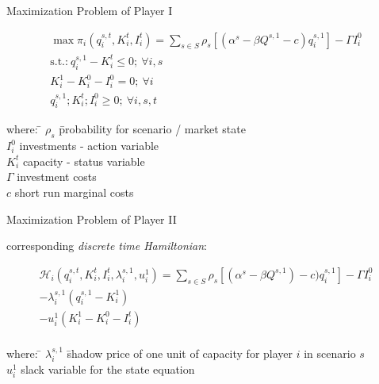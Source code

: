 \begin{frame}{Maximization Problem of Player I}

\begin{gather}
	\max \pi_i(q_{i}^{s,t},K_{i}^t,I_{i}^t)=
	\sum_{s\in S} \rho_s \left[ \left(\alpha^s- \beta Q^{s,1} - c\right) q_{i}^{s,1}  \right] - \Gamma I_{i}^{0} \label{eq:oligopmax2} \\
			\text{s.t.:} \  q_{i}^{s,1} - K_{i}^t \leq 0; \ \forall i,s \label{eq:capacitycon} \\ 
										  K^{1}_{i}  - K^{0}_{i}  - I_{i}^0 = 0 ; \ \forall i  \label{eq:state} \\
										   q_{i}^{s,1}; K^t_{i}; I_{i}^0	\geq 0; \ \forall i,s,t  \nonumber
\end{gather}

{\small
\begin{tabbing}
where: \= $\rho_s$ \= probability for scenario /  market state\\
\> $I_{i}^{0}$     \>   investments - action variable  \\
\> $K_{i}^t $      \>   capacity - status variable \\
\> $\Gamma$        \>   investment costs \\
\> $c$             \>   short run marginal costs \\
\end{tabbing}}
\end{frame}

\begin{frame}{Maximization Problem of Player II}

corresponding \emph{discrete time Hamiltonian}:

\begin{gather}
	 \mathcal{H}_i(q_{i}^{s,t},K_{i}^t,I_{i}^t,\lambda_{i}^{s,1},u_{i}^1)= 
	 \sum_{s\in S} \rho_s \left[\left(\alpha^s- \beta Q^{s,1}\right) - c) q_{i}^{s,1} \right]	- \Gamma I_{i}^{0}  \\ \nonumber  
	  	- \lambda_{i}^{s,1}(q_{i}^{s,1} - K^{1}_{i}) \\ \nonumber
			- u_{i}^1(K^{1}_{i}  - K^{0}_{i}  - I_{i}^t)	\\  \nonumber
\end{gather}

{\small
\begin{tabbing}
where: \= $\lambda_{i}^{s,1}$ \= shadow price of one unit of capacity for player $i$ in scenario $s$\\
\> $u_{i}^1$     \>  slack variable for the state equation\\
\end{tabbing}}

\end{frame}

